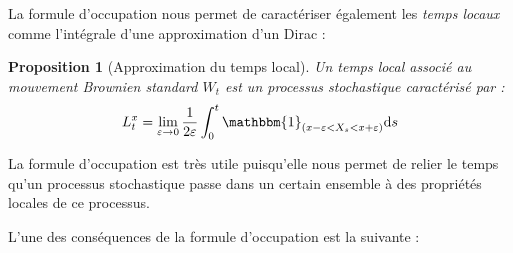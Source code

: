 \documentclass[openany]{book}
\newcommand{\1}{\mathbbm{1}}
\renewcommand{\d}{\mathrm{d}}
\theoremstyle{thmfont}
\theoremstyle{deffont}
\theoremstyle{thmfont}
\newtheorem{prop}[prop]{Proposition}
\theoremstyle{deffont}
\begin{document}
La formule d'occupation nous permet de caractériser également les \textit{temps locaux} comme l'intégrale d'une approximation d'un Dirac :

\begin{prop}[Approximation du temps local]
  \label{prop:caractTempsLoc}
  Un \textit{temps local} associé au mouvement Brownien standard $W_t$ est un processus stochastique caractérisé par :
\begin{equation*}
  L_t^x = \lim_{\varepsilon \to 0} \frac{1}{2\varepsilon} \int_0^t \1_{(x - \varepsilon < X_s < x + \varepsilon)} \d s
\end{equation*}
\end{prop}

La formule d'occupation est très utile puisqu'elle nous permet de relier le temps qu’un processus stochastique passe dans un certain ensemble à des propriétés locales de ce processus.

L'une des conséquences de la formule d'occupation est la suivante :
\end{document}
